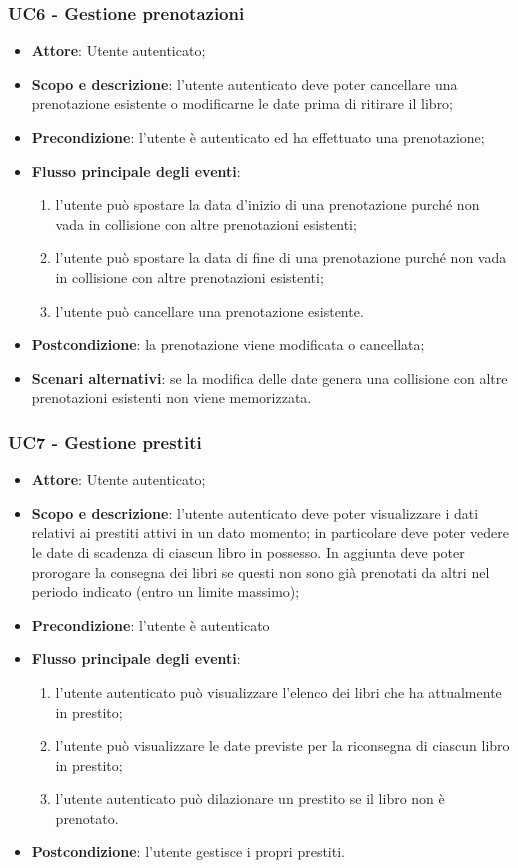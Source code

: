 \subsubsection{UC6 - Gestione prenotazioni}
\begin{itemize}
	\item \textbf{Attore}: Utente autenticato;
	\item \textbf{Scopo e descrizione}: l'utente autenticato deve poter cancellare una prenotazione esistente o modificarne le date prima di ritirare il libro;
	\item \textbf{Precondizione}: l'utente è autenticato ed ha effettuato una prenotazione;
	\item \textbf{Flusso principale degli eventi}:
	\begin{enumerate}
		\item l'utente può spostare la data d'inizio di una prenotazione purché non vada in collisione con altre prenotazioni esistenti;
		\item l'utente può spostare la data di fine di una prenotazione purché non vada in collisione con altre prenotazioni esistenti;
		\item l'utente può cancellare una prenotazione esistente.
	\end{enumerate} 
	\item \textbf{Postcondizione}: la prenotazione viene modificata o cancellata;
	\item \textbf{Scenari alternativi}: se la modifica delle date genera una collisione con altre prenotazioni esistenti non viene memorizzata.
\end{itemize}

\subsubsection{UC7 - Gestione prestiti}
\begin{itemize}
	\item \textbf{Attore}: Utente autenticato;
	\item \textbf{Scopo e descrizione}: l'utente autenticato deve poter visualizzare i dati relativi ai prestiti attivi in un dato momento; in particolare deve poter vedere le date di scadenza di ciascun libro in possesso. In aggiunta deve poter prorogare la consegna dei libri se questi non sono già prenotati da altri nel periodo indicato (entro un limite massimo); 
	\item \textbf{Precondizione}: l'utente è autenticato
	\item \textbf{Flusso principale degli eventi}:
	\begin{enumerate}
		\item l'utente autenticato può visualizzare l'elenco dei libri che ha attualmente in prestito;
		\item l'utente può visualizzare le date previste per la riconsegna di ciascun libro in prestito;
		\item l'utente autenticato può dilazionare un prestito se il libro non è prenotato.
	\end{enumerate} 
	\item \textbf{Postcondizione}: l'utente gestisce i propri prestiti.
\end{itemize}

